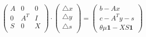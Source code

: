 \documentclass[a4paper, utf8, 11pt, colorlinks]{book}
\begin{document}
\begin{equation} \label{eq:newton-interior-system-k}    
	\begin{pmatrix}
		A   & 0      &  0      \\
		0   & A^T    &  I      \\
		S   & 0      & X       \\
	\end{pmatrix} 
	\cdot 
	\begin{pmatrix}
		\bigtriangleup  x  \\
		\bigtriangleup  y  \\
		\bigtriangleup  s  \\
	\end{pmatrix} 
	=
	\begin{pmatrix}
		b - Ax           \\
		c - A^T y - s      \\
		\theta \mu \mathbf{1} - X S \textbf{1}                      
	\end{pmatrix}
\end{equation}
\end{document}
